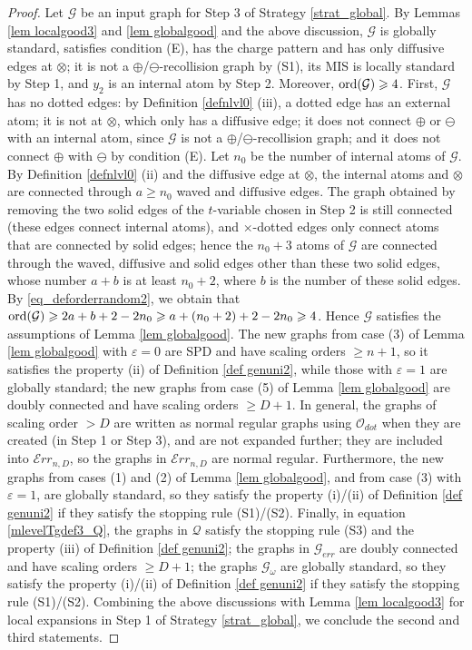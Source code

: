 \documentclass{article}
\newcommand{\1}{\mathds{1}}
\numberwithin{equation}{section}
\newcommand{\ord}{{\rm{ord}}}
\renewcommand{\cal}{\mathcal}
\renewcommand{\epsilon}{\varepsilon}
\renewcommand{\geq}{\geqslant}
\renewcommand{\ge}{\geq}
\newcommand{\dashed}{\text{diffusive}}
\theoremstyle{plain} %
\theoremstyle{remark}
\newcommand{\Err}{{\mathcal Err}}
\begin{document}
\begin{proof}
Let $\cal G$ be an input graph for Step 3 of Strategy \ref{strat_global}. %
By Lemmas \ref{lem localgood3} and \ref{lem globalgood} and the above discussion, $\cal G$ is globally standard, satisfies condition (E), has the charge pattern and has only $\dashed$ edges at $\otimes$; it is not a $\oplus$/$\ominus$-recollision graph by (S1), its MIS is locally standard by Step 1, and $y_2$ is an internal atom by Step 2. Moreover, $\ord(\cal G)\ge 4$. First, $\cal G$ has no dotted edges: by Definition \ref{defnlvl0} (iii), a dotted edge has an external atom; it is not at $\otimes$, which only has a $\dashed$ edge; it does not connect $\oplus$ or $\ominus$ with an internal atom, since $\cal G$ is not a $\oplus$/$\ominus$-recollision graph; and it does not connect $\oplus$ with $\ominus$ by condition (E). Let $n_0$ be the number of internal atoms of $\cal G$. By Definition \ref{defnlvl0} (ii) and the $\dashed$ edge at $\otimes$, the internal atoms and $\otimes$ are connected through $a\ge n_0$ waved and $\dashed$ edges. The graph obtained by removing the two solid edges of the $t$-variable chosen in Step 2 is still connected (these edges connect internal atoms), and $\times$-dotted edges only connect atoms that are connected by solid edges; hence the $n_0+3$ atoms of $\cal G$ are connected through the waved, $\dashed$ and solid edges other than these two solid edges, whose number $a+b$ is at least $n_0+2$, where $b$ is the number of these solid edges. By \eqref{eq_deforderrandom2}, we obtain that $\ord(\cal G)\ge 2a+b+2-2n_0\ge a+(n_0+2)+2-2n_0\ge 4$. Hence $\cal G$ satisfies the assumptions of Lemma \ref{lem globalgood}. The new graphs from case (3) of Lemma \ref{lem globalgood} with $\epsilon=0$ are SPD and have scaling orders $\ge n + 1$, so it satisfies the property (ii) of Definition \ref{def genuni2}, while those with $\epsilon=1$ are globally standard; the new graphs from case (5) of Lemma \ref{lem globalgood} are doubly connected and have scaling orders $\ge D + 1$. In general, the graphs of scaling order $>D$ are written as normal regular graphs using $\cal O_{dot}$ when they are created (in Step 1 or Step 3), and are not expanded further; they are included into $\Err_{n,D}$, so the graphs in $\Err_{n,D}$ are normal regular. Furthermore, the new graphs from cases (1) and (2) of Lemma \ref{lem globalgood}, and from case (3) with $\epsilon=1$, are globally standard, so they satisfy the property (i)/(ii) of Definition \ref{def genuni2} if they satisfy the stopping rule (S1)/(S2). Finally, in equation \eqref{mlevelTgdef3_Q}, the graphs in $\cal Q$ satisfy the stopping rule (S3) and the property (iii) of Definition \ref{def genuni2}; the graphs in $\cal G_{err}$ are doubly connected and have scaling orders $\ge D+1$; the graphs $\cal G_{\omega}$ are globally standard, so they satisfy the property (i)/(ii) of Definition \ref{def genuni2} if they satisfy the stopping rule (S1)/(S2). Combining the above discussions with Lemma \ref{lem localgood3} for local expansions in Step 1 of Strategy \ref{strat_global}, we conclude the second and third statements. 
	

\end{proof}
\end{document}
